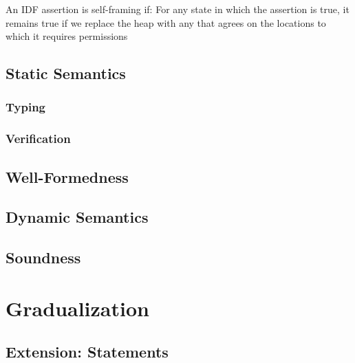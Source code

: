         
        An IDF assertion is self-framing if:
        For any state in which the assertion is true,
        it remains true if we replace the heap with any that agrees on the locations to which it requires permissions
    
    \subsection{Static Semantics}
    \label{sec:static-semantics}
    
        
        \subsubsection{Typing}
        \label{sssec:typing}
        
    
        \subsubsection{Verification}
        \label{sssec:verification}
        
    
    \subsection{Well-Formedness}
    \label{sec:well-formedness}
    
    
    \subsection{Dynamic Semantics}
    \label{ssec:dynamic-semantics}
    
    
    \subsection{Soundness}

\section{Gradualization}
\label{sec:cs-gradual-formulas}


    \subsection{Extension: Statements}
    \label{ssec:extension--statements}
    

